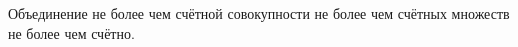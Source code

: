 \label{Kantor}
Объединение не более чем счётной совокупности не более чем счётных множеств не более чем счётно.
